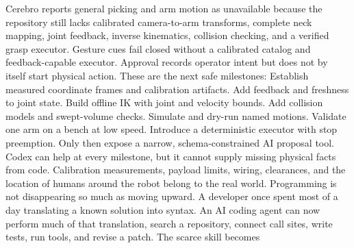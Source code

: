 {}Cerebro reports general picking and arm motion as unavailable because the\markdownRendererSoftLineBreak
{}repository still lacks calibrated camera-to-arm transforms, complete neck\markdownRendererSoftLineBreak
{}mapping, joint feedback, inverse kinematics, collision checking, and a verified\markdownRendererSoftLineBreak
{}grasp executor. Gesture cues fail closed without a calibrated catalog and\markdownRendererSoftLineBreak
{}feedback-capable executor. Approval records operator intent but does not by\markdownRendererSoftLineBreak
{}itself start physical action.\markdownRendererParagraphSeparator
{}These are the next safe milestones:\markdownRendererInterblockSeparator
{}\markdownRendererOlBegin
{}Establish measured coordinate frames and calibration artifacts.\markdownRendererOlItemEnd 
{}Add feedback and freshness to joint state.\markdownRendererOlItemEnd 
{}Build offline IK with joint and velocity bounds.\markdownRendererOlItemEnd 
{}Add collision models and swept-volume checks.\markdownRendererOlItemEnd 
{}Simulate and dry-run named motions.\markdownRendererOlItemEnd 
{}Validate one arm on a bench at low speed.\markdownRendererOlItemEnd 
{}Introduce a deterministic executor with stop preemption.\markdownRendererOlItemEnd 
{}Only then expose a narrow, schema-constrained AI proposal tool.\markdownRendererOlItemEnd 
\markdownRendererOlEnd \markdownRendererInterblockSeparator
{}Codex can help at every milestone, but it cannot supply missing physical facts\markdownRendererSoftLineBreak
{}from code. Calibration measurements, payload limits, wiring, clearances, and\markdownRendererSoftLineBreak
{}the location of humans around the robot belong to the real world.\markdownRendererInterblockSeparator
{}\markdownRendererThematicBreak{}\markdownRendererInterblockSeparator
{}
\markdownRendererSectionEnd \markdownRendererSectionBegin
{}\markdownRendererInterblockSeparator
{}Programming is not disappearing so much as moving upward. A developer once\markdownRendererSoftLineBreak
{}spent most of a day translating a known solution into syntax. An AI coding\markdownRendererSoftLineBreak
{}agent can now perform much of that translation, search a repository, connect\markdownRendererSoftLineBreak
{}call sites, write tests, run tools, and revise a patch. The scarce skill becomes\markdownRendererSoftLineBreak

